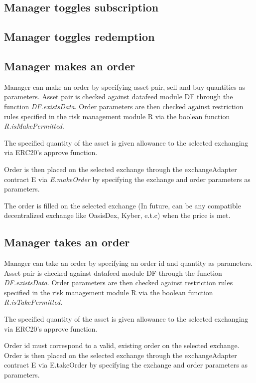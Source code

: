 \documentclass[conference]{IEEEtran}
\begin{document}
\subsection{Manager toggles subscription}

\subsection{Manager toggles redemption}

\subsection{Manager makes an order}

Manager can make an order by specifying asset pair, sell and buy quantities as parameters. Asset pair is checked against datafeed module DF through the function \textit{DF.existsData}. Order parameters are then checked against restriction rules specified in the risk management module R via the boolean function \textit{R.isMakePermitted}.

The specified quantity of the asset is given allowance to the selected exchanging via ERC20's approve function.

Order is then placed on the selected exchange through the exchangeAdapter contract E via \textit{E.makeOrder} by specifying the exchange and order parameters as parameters.

The order is filled on the selected exchange (In future, can be any compatible decentralized exchange like OasisDex, Kyber, e.t.c) when the price is met.

\subsection{Manager takes an order}

Manager can take an order by specifying an order id and quantity as parameters. Asset pair is checked against datafeed module DF through the function \textit{DF.existsData}. Order parameters are then checked against restriction rules specified in the risk management module R via the boolean function \textit{R.isTakePermitted}.

The specified quantity of the asset is given allowance to the selected exchanging via ERC20's approve function.

Order id must correspond to a valid, existing order on the selected exchange. Order is then placed on the selected exchange through the exchangeAdapter contract E via E.takeOrder by specifying the exchange and order parameters as parameters.
\end{document}
